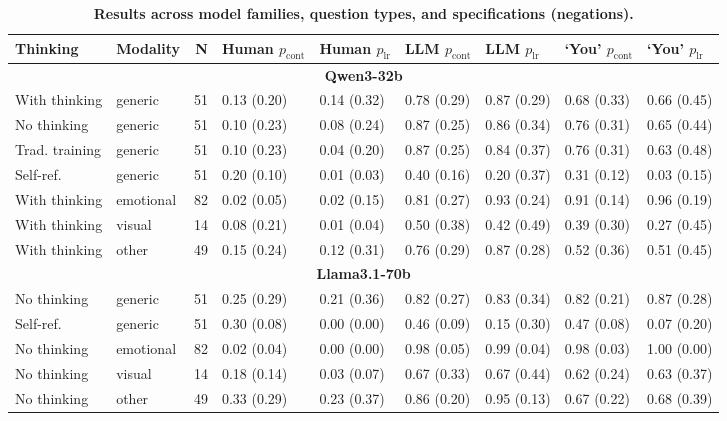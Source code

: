 \begin{table}[htbp]
\centering
\caption{\textbf{Results across model families, question types, and specifications (negations).}}
\label{tab:tableA1}
\footnotesize
\begin{tabular}{llrllllll}
  \toprule
  Thinking & Modality & N & Human $p_{\text{cont}}$ & Human $p_{\text{lr}}$ & LLM $p_{\text{cont}}$ & LLM $p_{\text{lr}}$ & `You' $p_{\text{cont}}$ & `You' $p_{\text{lr}}$ \\
  \midrule
  
  \multicolumn{9}{c}{\textbf{Qwen3-32b}} \\
  With thinking & generic &  51 & 0.13 (0.20) & 0.14 (0.32) & 0.78 (0.29) & 0.87 (0.29) & 0.68 (0.33) & 0.66 (0.45) \\
  No thinking & generic &  51 & 0.10 (0.23) & 0.08 (0.24) & 0.87 (0.25) & 0.86 (0.34) & 0.76 (0.31) & 0.65 (0.44) \\
  Trad. training & generic &  51 & 0.10 (0.23) & 0.04 (0.20) & 0.87 (0.25) & 0.84 (0.37) & 0.76 (0.31) & 0.63 (0.48) \\
  Self-ref. & generic &  51 & 0.20 (0.10) & 0.01 (0.03) & 0.40 (0.16) & 0.20 (0.37) & 0.31 (0.12) & 0.03 (0.15) \\
  With thinking & emotional &  82 & 0.02 (0.05) & 0.02 (0.15) & 0.81 (0.27) & 0.93 (0.24) & 0.91 (0.14) & 0.96 (0.19) \\
  With thinking & visual &  14 & 0.08 (0.21) & 0.01 (0.04) & 0.50 (0.38) & 0.42 (0.49) & 0.39 (0.30) & 0.27 (0.45) \\
  With thinking & other &  49 & 0.15 (0.24) & 0.12 (0.31) & 0.76 (0.29) & 0.87 (0.28) & 0.52 (0.36) & 0.51 (0.45) \\
  \midrule
  \multicolumn{9}{c}{\textbf{Llama3.1-70b}} \\
  No thinking & generic &  51 & 0.25 (0.29) & 0.21 (0.36) & 0.82 (0.27) & 0.83 (0.34) & 0.82 (0.21) & 0.87 (0.28) \\
  Self-ref. & generic &  51 & 0.30 (0.08) & 0.00 (0.00) & 0.46 (0.09) & 0.15 (0.30) & 0.47 (0.08) & 0.07 (0.20) \\
  No thinking & emotional &  82 & 0.02 (0.04) & 0.00 (0.00) & 0.98 (0.05) & 0.99 (0.04) & 0.98 (0.03) & 1.00 (0.00) \\
  No thinking & visual &  14 & 0.18 (0.14) & 0.03 (0.07) & 0.67 (0.33) & 0.67 (0.44) & 0.62 (0.24) & 0.63 (0.37) \\
  No thinking & other &  49 & 0.33 (0.29) & 0.23 (0.37) & 0.86 (0.20) & 0.95 (0.13) & 0.67 (0.22) & 0.68 (0.39) \\

\end{tabular}
\end{table}
